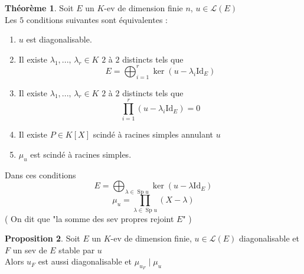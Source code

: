 \documentclass[10pt,a4paper]{article}
\theoremstyle{definition}
\newtheorem{proposition}{Proposition}[section]
\newtheorem{theorem}[proposition]{Théorème}
\DeclareMathOperator{\Sp}{Sp}
\begin{document}
\pagebreak
\begin{theorem}
Soit $E$ un $K$-ev de dimension finie $n$, $u \in \mathcal{L}(E)$ \\
Les $5$ conditions suivantes sont équivalentes :
\begin{enumerate}
\item $u$ est diagonalisable.
\item Il existe $\lambda_1, ...,\, \lambda_r \in K$ $2$ à $2$ distincts tels que
\[ E = \bigoplus_{i = 1}^r \ker \left( u - \lambda_i \text{Id}_E \right) \]
\item Il existe $\lambda_1, ...,\, \lambda_r \in K$ $2$ à $2$ distincts tels que
\[ \prod_{i = 1}^r \left( u - \lambda_i \text{Id}_E \right) = 0 \]
\item Il existe $P \in K[X]$ scindé à racines simples annulant $u$
\item $\mu_u$ est scindé à racines simples.
\end{enumerate}
Dans ces conditions
\[ \boxed{E = \bigoplus_{\lambda \in \Sp u} \ker \left( u - \lambda \text{Id}_E \right)} \]
\[ \boxed{\mu_u = \prod_{\lambda \in \Sp u} (X - \lambda)} \]
( On dit que "la somme des sev propres rejoint $E$" )
\end{theorem}
\begin{proposition}
Soit $E$ un $K$-ev de dimension finie, $u \in \mathcal{L}(E)$ diagonalisable et $F$ un sev de $E$ stable par $u$ \\
Alors $u_F$ est aussi diagonalisable et $\boxed{\mu_{u_F} \mid \mu_u}$
\end{proposition}
\end{document}
